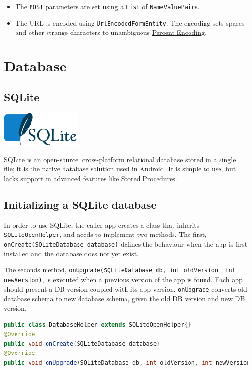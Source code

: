 \documentclass{article}
\def\cw#1{\texttt{#1}}
\begin{document}
\begin{itemize}
\item{The \cw{POST} parameters are set using a \cw{List} of \cw{NameValuePair}s. }
\item{The URL is encoded using \cw{UrlEncodedFormEntity}. The encoding sets spaces and other strange characters to unambiguous  \href{http://en.wikipedia.org/wiki/Percent-encoding}{Percent Encoding}. }
\end{itemize}

\section{Database}
\subsection{SQLite}

\begin{center}
\includegraphics[width=0.3\textwidth]{img/sqlite_logo_wikipedia.eps}
\end{center}

SQLite is an open-source, cross-platform relational database stored in a single file; it is the native database solution used in Android. It is simple to use, but lacks support in advanced features like Stored Procedures.

\subsection{Initializing a SQLite database}
 In order to use SQLite, the caller app creates a class that inherits \cw{SQLiteOpenHelper}, and needs to implement two methods. The first, \cw{onCreate(SQLiteDatabase database)} defines the behaviour when the app is first installed and the database does not yet exist. 

The seconds method, \cw{onUpgrade(SQLiteDatabase db, int oldVersion, int newVersion)}, is executed when a previous version of the app is found. Each app should present a DB version coupled with its app version. \cw{onUpgrade} converts old database schema to new database schema, given the old DB version and new DB version.

\begin{code} \begin{lstlisting}[language=Java]
public class DatabaseHelper extends SQLiteOpenHelper{}
@Override
public void onCreate(SQLiteDatabase database)
@Override
public void onUpgrade(SQLiteDatabase db, int oldVersion, int newVersion)
\end{lstlisting} \end{code}
\end{document}

